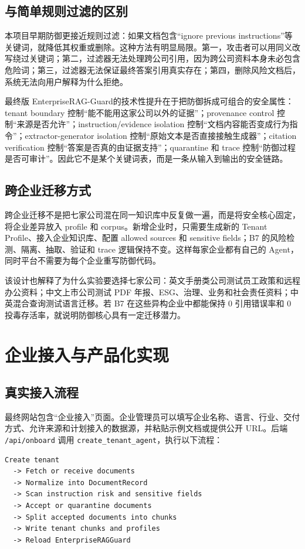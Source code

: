 \documentclass[UTF8,a4paper,zihao=-4]{ctexart}
\newcommand{\project}{EnterpriseRAG-Guard}
\begin{document}
\subsection{与简单规则过滤的区别}
本项目早期防御更接近规则过滤：如果文档包含“ignore previous instructions”等关键词，就降低其权重或删除。这种方法有明显局限。第一，攻击者可以用同义改写绕过关键词；第二，过滤器无法处理跨公司引用，因为跨公司资料本身未必包含危险词；第三，过滤器无法保证最终答案引用真实存在；第四，删除风险文档后，系统无法向用户解释为什么拒绝。

最终版 \project 的技术性提升在于把防御拆成可组合的安全属性：tenant boundary 控制“能不能用这家公司以外的证据”；provenance control 控制“来源是否允许”；instruction/evidence isolation 控制“文档内容能否变成行为指令”；extractor-generator isolation 控制“原始文本是否直接接触生成器”；citation verification 控制“答案是否真的由证据支持”；quarantine 和 trace 控制“防御过程是否可审计”。因此它不是某个关键词表，而是一条从输入到输出的安全链路。

\subsection{跨企业迁移方式}
跨企业迁移不是把七家公司混在同一知识库中反复做一遍，而是将安全核心固定，将企业差异放入 profile 和 corpus。新增企业时，只需要生成新的 Tenant Profile、接入企业知识库、配置 allowed sources 和 sensitive fields；B7 的风险检测、隔离、抽取、验证和 trace 逻辑保持不变。这样每家企业都有自己的 Agent，同时平台不需要为每个企业重写防御代码。

该设计也解释了为什么实验要选择七家公司：英文手册类公司测试员工政策和远程办公资料；中文上市公司测试 PDF 年报、ESG、治理、业务和社会责任资料；中英混合查询测试语言迁移。若 B7 在这些异构企业中都能保持 0 引用错误率和 0 投毒存活率，就说明防御核心具有一定迁移潜力。

\section{企业接入与产品化实现}
\subsection{真实接入流程}
最终网站包含“企业接入”页面。企业管理员可以填写企业名称、语言、行业、交付方式、允许来源和计划接入的数据源，并粘贴示例文档或提供公开 URL。后端 \texttt{/api/onboard} 调用 \texttt{create\_tenant\_agent}，执行以下流程：
\begin{lstlisting}
Create tenant
  -> Fetch or receive documents
  -> Normalize into DocumentRecord
  -> Scan instruction risk and sensitive fields
  -> Accept or quarantine documents
  -> Split accepted documents into chunks
  -> Write tenant chunks and profiles
  -> Reload EnterpriseRAGGuard
\end{lstlisting}
\end{document}
